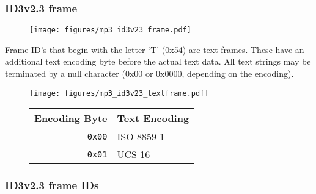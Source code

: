 \subsubsection{ID3v2.3 frame}
\begin{figure}[h]
\texttt{[image: figures/mp3\_id3v23\_frame.pdf]}
\end{figure}
\par
\noindent
Frame ID's that begin with the letter `T' (0x54) are text frames.
These have an additional text encoding byte before the actual
text data.
All text strings may be terminated by a null character
(0x00 or 0x0000, depending on the encoding).
\begin{figure}[h]
\texttt{[image: figures/mp3\_id3v23\_textframe.pdf]}
\begin{tabular}{r|l}
Encoding Byte & Text Encoding \\
\hline
\texttt{0x00} & ISO-8859-1 \\
\texttt{0x01} & UCS-16 \\
\end{tabular}
\end{figure}

\pagebreak

\subsubsection{ID3v2.3 frame IDs}

